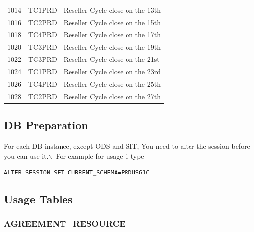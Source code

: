 \documentclass[12pt,twoside]{article}
\begin{document}
\begin{longtable}{c|l|l}
1014 & TC1PRD & Reseller Cycle close on the 13th\\
1016 & TC2PRD & Reseller Cycle close on the 15th\\
1018 & TC4PRD & Reseller Cycle close on the 17th\\
1020 & TC3PRD & Reseller Cycle close on the 19th\\
1022 & TC3PRD & Reseller Cycle close on the 21st\\
1024 & TC1PRD & Reseller Cycle close on the 23rd\\
1026 & TC4PRD & Reseller Cycle close on the 25th\\
1028 & TC2PRD & Reseller Cycle close on the 27th\\
\hline
\end{longtable}
\normalsize
\subsection{DB Preparation}
\label{sec:orgheadline71}
For each DB instance, except ODS and SIT, You need to alter the
session before you can use it.$\backslash$\ For example for usage 1 type
\begin{verbatim}
ALTER SESSION SET CURRENT_SCHEMA=PRDUSG1C
\end{verbatim}
\subsection{Usage Tables}
\label{sec:orgheadline85}
\subsubsection{AGREEMENT\_RESOURCE}
\label{sec:orgheadline72}
\footnotesize
\end{document}
